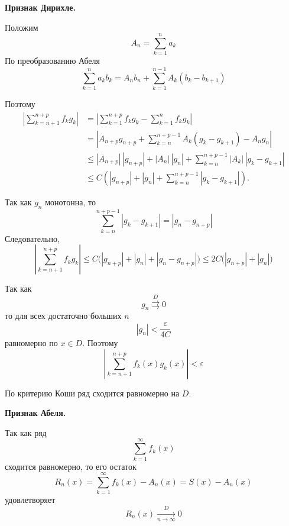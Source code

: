 \documentclass[12pt,a4paper]{article}
\begin{document}
\begin{proofbox}{}

    \textbf{Признак Дирихле.}

    Положим
    \[
        A_n=\sum_{k=1}^{n}a_k
    \]
    По преобразованию Абеля
    \[
        \sum_{k=1}^{n}a_kb_k
        =
        A_nb_n+
        \sum_{k=1}^{n-1}A_k(b_k-b_{k+1})
    \]

    Поэтому
    \[
        \begin{aligned}
            \left|
            \sum_{k=n+1}^{n+p}f_k g_k
            \right|
            &=
            \left|
            \sum_{k=1}^{n+p}f_k g_k
            -
            \sum_{k=1}^{n}f_k g_k
            \right|
            \\
            &=
            \left|
            A_{n+p}g_{n+p}
            +
            \sum_{k=n}^{n+p-1}A_k(g_k-g_{k+1})
            -
            A_ng_n
            \right|
            \\
            &\leq
            |A_{n+p}|\,|g_{n+p}|
            +
            |A_n|\,|g_n|
            +
            \sum_{k=n}^{n+p-1}|A_k|\,|g_k-g_{k+1}|
            \\
            &\leq
            C\left(
            |g_{n+p}|+|g_n|
            +
            \sum_{k=n}^{n+p-1}|g_k-g_{k+1}|
            \right).
        \end{aligned}
    \]

    Так как $g_n$ монотонна, то
    \[
        \sum_{k=n}^{n+p-1}|g_k-g_{k+1}|
        =
        |g_n-g_{n+p}|
    \]
    Следовательно,
    \[
        \left|
        \sum_{k=n+1}^{n+p}f_k g_k
        \right|
        \leq
        C\bigl(|g_{n+p}|+|g_n|+|g_n-g_{n+p}|\bigr)
        \leq
        2C\bigl(|g_{n+p}|+|g_n|\bigr)
    \]

    Так как
    \[
        g_n\overset{D}{\rightrightarrows}0
    \]
    то для всех достаточно больших $n$
    \[
        |g_n|<\frac{\varepsilon}{4C}
    \]
    равномерно по $x\in D$. Поэтому
    \[
        \left|
        \sum_{k=n+1}^{n+p}f_k(x)g_k(x)
        \right|<\varepsilon
    \]

    По критерию Коши ряд сходится равномерно на $D$.

\bigskip

    \textbf{Признак Абеля.}

    Так как ряд
    \[
    \sum_{k=1}^{\infty}f_k(x)
    \]
    сходится равномерно, то его остаток
    \[
    R_n(x)=\sum_{k=1}^{\infty}f_k(x) - A_n(x) = S(x) - A_n(x)
    \]
    удовлетворяет
    \[
    R_n(x)\xrightarrow[n\to\infty]{D}0
    \]


\end{proofbox}
\end{document}
